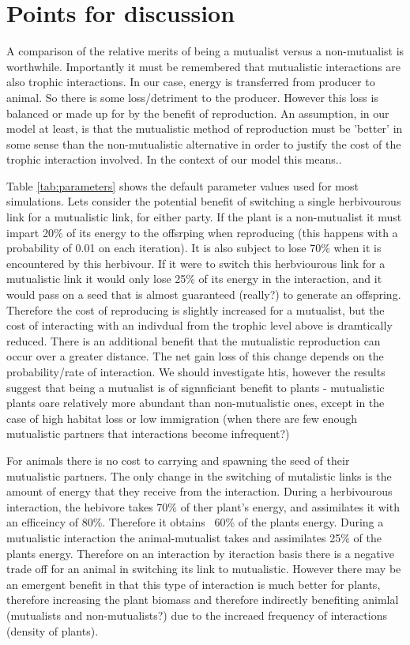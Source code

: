 \section{Points for discussion}

A comparison of the relative merits of being a mutualist versus a non-mutualist is worthwhile. Importantly it must be remembered that mutualistic interactions are also trophic interactions. In our case, energy is transferred from producer to animal. So there is some loss/detriment to the producer. However this loss is balanced or made up for by the benefit of reproduction. An assumption, in our model at least, is that the mutualistic method of reproduction must be 'better' in some sense than the non-mutualistic alternative in order to justify the cost of the trophic interaction involved. In the context of our model this means..

Table \ref{tab:parameters} shows the default parameter values used for most simulations. Lets consider the potential benefit of switching a single herbivourous link for a mutualistic link, for either party. If the plant is a non-mutualist it must impart 20\% of its energy to the offsrping when reproducing (this happens with a probability of 0.01 on each iteration). It is also subject to lose 70\% when it is encountered by this herbivour. If it were to switch this herbviourous link for a mutualistic link it would only lose 25\% of its energy in the interaction, and it would pass on a seed that is almost guaranteed (really?) to generate an offspring. Therefore the cost of reproducing is slightly increased for a mutualist, but the cost of interacting with an indivdual from the trophic level above is dramtically reduced. There is an additional benefit that the mutualistic reproduction can occur over a greater distance. The net gain loss of this change depends on the probability/rate of interaction. We should investigate htis, however the results suggest that being a mutualist is of signnficiant benefit to plants - mutualistic plants oare relatively more abundant than non-mutualistic ones, except in the case of high habitat loss or low immigration (when there are few enough mutualistic partners that interactions become infrequent?) 

For animals there is no cost to carrying and spawning the seed of their mutualistic partners. The only change in the switching of mutalistic links is the amount of energy that they receive from the interaction. During a herbivourous interaction, the hebivore takes 70\% of ther plant's energy, and assimilates it with an efficeincy of 80\%. Therefore it obtains ~60\% of the plants energy. During a mutualistic interaction the animal-mutualist takes and assimilates 25\% of the plants energy. Therefore on an interaction by iteraction basis there is a negative trade off for an animal in switching its link to mutualistic. However there may be an emergent benefit in that this type of interaction is much better for plants, therefore increasing the plant biomass and therefore indirectly benefiting animlal (mutualists and non-mutualists?) due to the increaed frequency of interactions (density of plants).       

